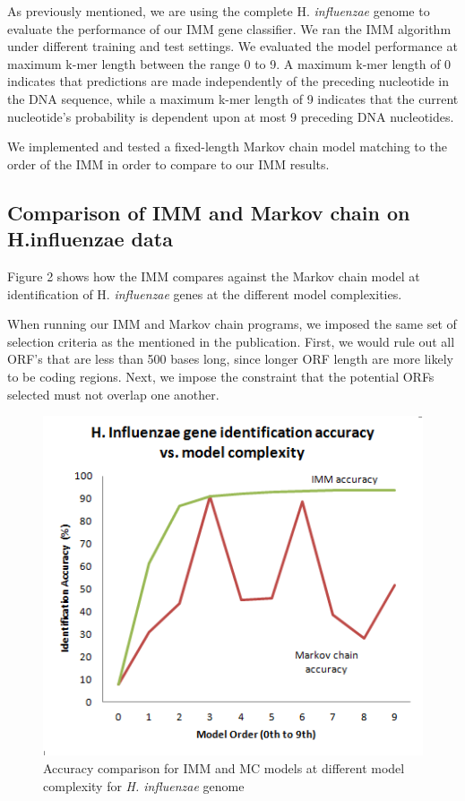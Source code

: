 \documentclass[11pt,letterpaper]{article}
\begin{document}
As previously mentioned, we are using the complete H. \emph{influenzae} genome to evaluate the performance of our IMM gene classifier. We ran the IMM algorithm under different training and test settings. We evaluated the model performance at maximum k-mer length between the range 0 to 9. A maximum k-mer length of 0 indicates that predictions are made independently of the preceding nucleotide in the DNA sequence, while a maximum k-mer length of 9 indicates that the current nucleotide’s probability is dependent upon at most 9 preceding DNA nucleotides. 

We implemented and tested a fixed-length Markov chain model matching to the order of the IMM in order to compare to our IMM results.

\subsection{Comparison of IMM and Markov chain on H.influenzae data}
Figure 2 shows how the IMM compares against the Markov chain model at identification of H. \emph{influenzae} genes at the different model complexities.

When running our IMM and Markov chain programs, we imposed the same set of selection criteria as the mentioned in the publication. First, we would rule out all ORF’s that are less than 500 bases long, since longer ORF length are more likely to be coding regions. Next, we impose the constraint that the potential ORFs selected must not overlap one another. 

\begin{figure}
	\begin{center}
		\includegraphics[scale=0.8]{plots/accuracy_vs_model_complexity.png}
	\end{center}
	\caption{\label{font-table} Accuracy comparison for IMM and MC models at different model complexity for \emph{H. influenzae} genome}
\end{figure}
\end{document}
